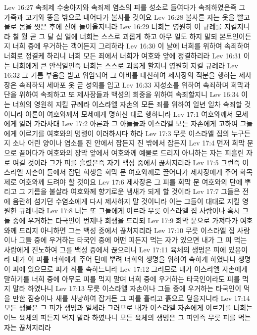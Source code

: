 Lev 16:27  속죄제 수송아지와 속죄제 염소의 피를 성소로 들여다가 속죄하였은즉 그 가죽과 고기와 똥을 밖으로 내어다가 불사를 것이요
Lev 16:28  불사른 자는 옷을 빨고 물로 몸을 씻은 후에 진에 들어올지니라
Lev 16:29  너희는 영원히 이 규례를 지킬지니라 칠 월 곧 그 달 십 일에 너희는 스스로 괴롭게 하고 아무 일도 하지 말되 본토인이든지 너희 중에 우거하는 객이든지 그리하라
Lev 16:30  이 날에 너희를 위하여 속죄하여 너희로 정결케 하리니 너희 모든 죄에서 너희가 여호와 앞에 정결하리라
Lev 16:31  이는 너희에게 큰 안식일인즉 너희는 스스로 괴롭게 할지니 영원히 지킬 규례라
Lev 16:32  그 기름 부음을 받고 위임되어 그 아비를 대신하여 제사장의 직분을 행하는 제사장은 속죄하되 세마포 옷 곧 성의를 입고
Lev 16:33  지성소를 위하여 속죄하며 회막과 단을 위하여 속죄하고 또 제사장들과 백성의 회중을 위하여 속죄할지니
Lev 16:34  이는 너희의 영원히 지킬 규례라 이스라엘 자손의 모든 죄를 위하여 일년 일차 속죄할 것이니라 아론이 여호와께서 모세에게 명하신 대로 행하니라
Lev 17:1  여호와께서 모세에게 일러 가라사대
Lev 17:2  아론과 그 아들들과 이스라엘 모든 자손에게 고하여 그들에게 이르기를 여호와의 명령이 이러하시다 하라
Lev 17:3  무릇 이스라엘 집의 누구든지 소나 어린 양이나 염소를 진 안에서 잡든지 진 밖에서 잡든지
Lev 17:4  먼저 희막 문으로 끌어다가 여호와의 장막 앞에서 여호와께 예물로 드리지 아니하는 자는 피흘린 자로 여길 것이라 그가 피를 흘렸은즉 자기 백성 중에서 끊쳐지리라
Lev 17:5  그런즉 이스라엘 자손이 들에서 잡던 희생을 회막 문 여호와께로 끌어다가 제사장에게 주어 화목제로 여호와께 드려야 할 것이요
Lev 17:6  제사장은 그 피를 회막 문 여호와의 단에 뿌리고 그 기름을 불살라 여호와께 향기로운 냄새가 되게 할 것이라
Lev 17:7  그들은 전에 음란히 섬기던 수염소에게 다시 제사하지 말 것이니라 이는 그들이 대대로 지킬 영원한 규례니라
Lev 17:8  너는 또 그들에게 이르라 무릇 이스라엘 집 사람이나 혹시 그들 중에 우거하는 타국인이 번제나 희생을 드리되
Lev 17:9  회막 문으로 가져다가 여호와께 드리지 아니하면 그는 백성 중에서 끊쳐지리라
Lev 17:10  무릇 이스라엘 집 사람이나 그들 중에 우거하는 타국인 중에 어떤 피든지 먹는 자가 있으면 내가 그 피 먹는 사람에게 진노하여 그를 백성 중에서 끊으리니
Lev 17:11  육체의 생명은 피에 있음이라 내가 이 피를 너희에게 주어 단에 뿌려 너희의 생명을 위하여 속하게 하였나니 생명이 피에 있으므로 피가 죄를 속하느니라
Lev 17:12  그러므로 내가 이스라엘 자손에게 말하기를 너희 중에 아무도 피를 먹지 말며 너희 중에 우거하는 타국인이라도 피를 먹지 말라 하였나니
Lev 17:13  무릇 이스라엘 자손이나 그들 중에 우거하는 타국인이 먹을 만한 짐승이나 새를 사냥하여 잡거든 그 피를 흘리고 흙으로 덮을지니라
Lev 17:14  모든 생물은 그 피가 생명과 일체라 그러므로 내가 이스라엘 자손에게 이르기를 너희는 어느 육체의 피든지 먹지 말라 하였나니 모든 육체의 생명은 그 피인즉 무릇 피를 먹는 자는 끊쳐지리라
